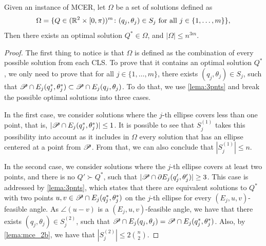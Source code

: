 \begin{theorem}\label{th:mcer}
	Given an instance of MCER, let $\Omega$ be a set of solutions defined as 
\begin{equation*}\label{eq:omega}
\Omega = \{Q \in (\mathbb{R}^2\times[0, \pi))^m \colon (q_j, \theta_j) \in S_j \textnormal{ for all } j\in\{1, \dots, m\}\},
\end{equation*}
Then there exists an optimal solution $Q^* \in \Omega$, and $|\Omega|\le n^{3m}$.
\end{theorem}
\begin{proof}
		The first thing to notice is that $\Omega$ is defined as the combination of every possible solution from each CLS. To prove that it contains an optimal solution $Q^*$, we only need to prove that for all $j\in\{1, \dots, m\}$, there exists $(q_j, \theta_j)\in S_j$, such that $\mathscr{P} \cap E_j(q_j^*, \theta_j^*) \subset \mathscr{P} \cap E_j(q_j, \theta_j)$. To do that, we use \autoref{lema:3pnts} and break the possible optimal solutions into three cases.
	
	In the first case, we consider solutions where the $j$-th ellipse covers less than one point, that is, $|\mathscr{P} \cap E_j(q_j^*, \theta_j^*)|\le1$. It is possible to see that $S_j^{(1)}$ takes this possibility into account as it includes in $\Omega$ every solution that has an ellipse centered at a point from $\mathscr{P}$. From that, we can also conclude that $|S_j^{(1)}| \le n$.
	
	In the second case, we consider solutions where the $j$-th ellipse covers at least two points, and there is no $Q' \succ Q^*$, such that $|\mathscr{P} \cap \partial E_j(q_j', \theta_j')| \ge 3$.
	This case is addressed by \autoref{lema:3pnts}, which states that there are equivalent solutions to $Q^*$ with two points $u, v \in \mathscr{P} \cap E_j(q_j^*, \theta_j^*)$ on the $j$-th ellipse for every $(E_j, u, v)$-feasible angle.
	As $\angle(u-v)$ is a $(E_j, u, v)$-feasible angle, we have that there exists $(q_j, \theta_j) \in S_j^{(2)}$, such that $\mathscr{P} \cap E_j(q_j, \theta_j) = \mathscr{P} \cap E_j(q_j^*, \theta_j^*)$.
	Also, by \autoref{lema:mce_2b}, we have that $|S_j^{(2)}| \le 2\binom{n}{2}$.
	
	

\end{proof}
